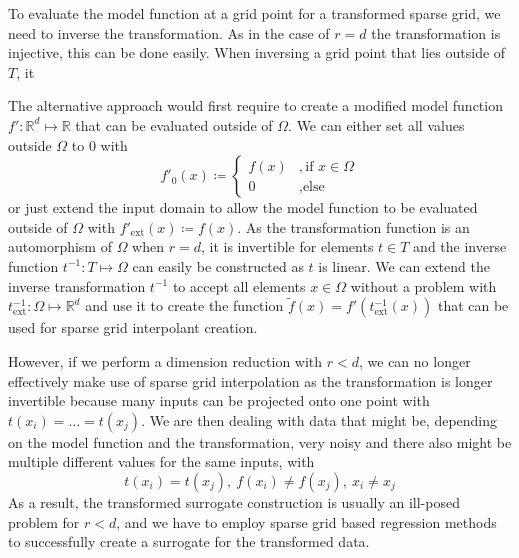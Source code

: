 \documentclass[
  a4paper,  %
  twoside,  %
  bibliography=totoc,
  headsepline,
  cleardoublepage=empty,
  parskip=half,
  draft=false
]{scrbook}
\begin{document}
To evaluate the model function at a grid point for a transformed sparse grid, we need to inverse the transformation.
As in the case of $r=d$ the transformation is injective, this can be done easily.
When inversing a grid point that lies outside of $T$, it

The alternative approach would first require to create a modified model function $f' \colon \mathds{R}^d \mapsto \mathds{R}$ that can be evaluated outside of $\Omega$.
We can either set all values outside $\Omega$ to 0 with
\begin{equation}
f'_0(x) \coloneqq \begin{cases}
f(x)&, \text{if $x \in \Omega$}\\
0&,\text{else}
\end{cases}
\end{equation}
or just extend the input domain to allow the model function to be evaluated outside of $\Omega$ with $f'_{\text{ext}}(x) \coloneqq f(x)$.
As the transformation function is an automorphism of $\Omega$ when $r=d$, it is invertible for elements $t \in T$ and the inverse function $t^{-1} \colon T \mapsto \Omega$ can easily be constructed as $t$ is linear.
We can extend the inverse transformation $t^{-1}$ to accept all elements $x \in \Omega$ without a problem with $t^{-1}_{\text{ext}} \colon \Omega \mapsto \mathds{R}^d$ and use it to create the function $\tilde{f}(x)=f'(t^{-1}_{\text{ext}}(x))$ that can be used for sparse grid interpolant creation.

However, if we perform a dimension reduction with $r < d$, we can no longer effectively make use of sparse grid interpolation as the transformation is longer invertible because many inputs can be projected onto one point with $t(x_i)=\dots=t(x_j)$.
We are then dealing with data that might be, depending on the model function and the transformation, very noisy and there also might be multiple different values for the same inputs, with
\begin{equation}
t(x_i)=t(x_j), ~ f(x_i) \neq f(x_j), ~ x_i \neq x_j
\end{equation}
As a result, the transformed surrogate construction is usually an ill-posed problem for $r < d$, and we have to employ sparse grid based regression methods to successfully create a surrogate for the transformed data.
\end{document}
